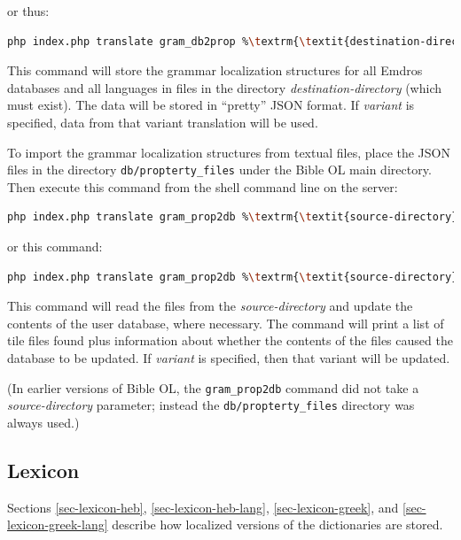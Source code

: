 \documentclass[11pt,oneside,a4paper]{memoir}
\begin{document}
\noindent
or thus:

\begin{lstlisting}[language=bash,basicstyle={\ttfamily}]
php index.php translate gram_db2prop %\textrm{\textit{destination-directory}}% %\textrm{\textit{variant}}%
\end{lstlisting}

This command will store the grammar localization structures for all Emdros databases and all
languages in files in the directory \emph{destination-directory} (which must exist). The data will
be stored in ``pretty'' JSON format. If \emph{variant} is specified, data from that variant
translation will be used.

To import the grammar localization structures from textual files, place the JSON files in the directory
\texttt{db/propterty\_files} under the Bible OL main directory. Then execute this command from the
shell command line on the server:

\begin{lstlisting}[language=bash,basicstyle={\ttfamily}]
php index.php translate gram_prop2db %\textrm{\textit{source-directory}}%
\end{lstlisting}

\noindent
or this command:

\begin{lstlisting}[language=bash,basicstyle={\ttfamily}]
php index.php translate gram_prop2db %\textrm{\textit{source-directory}}% %\textrm{\textit{variant}}%
\end{lstlisting}

This command will read the files from the \emph{source-directory} and update the contents of the
user database, where necessary. The command will print a list of tile files found plus information
about whether the contents of the files caused the database to be updated. If \emph{variant} is
specified, then that variant will be updated.

(In earlier versions of Bible OL, the \texttt{gram\_prop2db} command did not take a
\emph{source-directory} parameter; instead the \texttt{db/propterty\_files} directory was always used.)

\subsection{Lexicon}

Sections \ref{sec-lexicon-heb}, \ref{sec-lexicon-heb-lang}, \ref{sec-lexicon-greek}, and
\ref{sec-lexicon-greek-lang} describe how localized versions of the dictionaries are stored.
\end{document}
